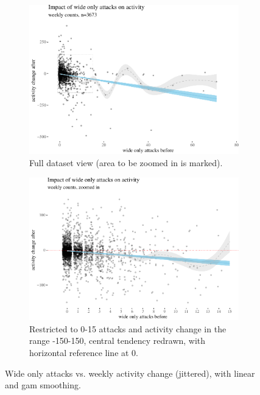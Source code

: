 \documentclass[10pt,]{scrartcl}
\begin{document}
\begin{figure}
\Centering
\begin{subfigure}[b]{0.95\textwidth}

\begin{center}\includegraphics[width=1\linewidth]{redditAnalysisWalkthrough_files/figure-latex/unnamed-chunk-14-1} \end{center}
\caption{Full dataset view (area to be zoomed in is marked).}
\end{subfigure}
 
\begin{subfigure}[b]{0.95\textwidth}

\begin{center}\includegraphics[width=1\linewidth]{redditAnalysisWalkthrough_files/figure-latex/unnamed-chunk-15-1} \end{center}
\caption{Restricted to 0-15 attacks and activity change in the range -150-150, central tendency redrawn, with horizontal reference line at 0.}
\end{subfigure}
\caption{Wide only attacks vs. weekly activity change (jittered), with  linear and gam smoothing.}
\label{fig:lowOnlyPlots}
\end{figure}
\end{document}
